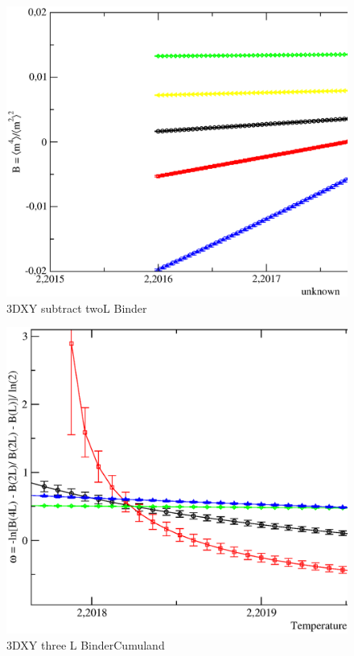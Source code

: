 \begin{figure}[!htpb]
  \centering
  \includegraphics[width=\textwidth]{./plots/3DXY/vsT/subtract_twoL_Binder.eps}
  \caption{3DXY subtract twoL Binder}
\end{figure}

\begin{figure}[!htpb]
  \centering
  \includegraphics[width=\textwidth]{./plots/3DXY/vsO/three_L_BinderCumuland.eps}
  \caption{3DXY three L BinderCumuland}
\end{figure}

